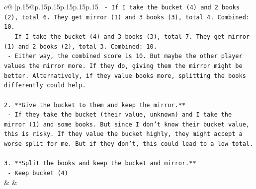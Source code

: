 \documentclass{article}
\begin{document}
{\begin{supertabular}{c@{$\;$}|p{.15\linewidth}@{}p{.15\linewidth}p{.15\linewidth}p{.15\linewidth}p{.15\linewidth}p{.15\linewidth}}
{{{\texttt{   {-} If I take the bucket (4) and 2 books (2), total 6. They get mirror (1) and 3 books (3), total 4. Combined: 10.} \\
\texttt{   {-} If I take the bucket (4) and 3 books (3), total 7. They get mirror (1) and 2 books (2), total 3. Combined: 10.} \\
\texttt{   {-} Either way, the combined score is 10. But maybe the other player values the mirror more. If they do, giving them the mirror might be better. Alternatively, if they value books more, splitting the books differently could help.} \\
\\ 
\texttt{2. **Give the bucket to them and keep the mirror.**} \\
\texttt{   {-} If they take the bucket (their value, unknown) and I take the mirror (1) and some books. But since I don't know their bucket value, this is risky. If they value the bucket highly, they might accept a worse split for me. But if they don't, this could lead to a low total.} \\
\\ 
\texttt{3. **Split the books and keep the bucket and mirror.**} \\
\texttt{   {-} Keep bucket (4)} \\
            }
        }
    }
    & & \\ \\


\end{supertabular}}
\end{document}
